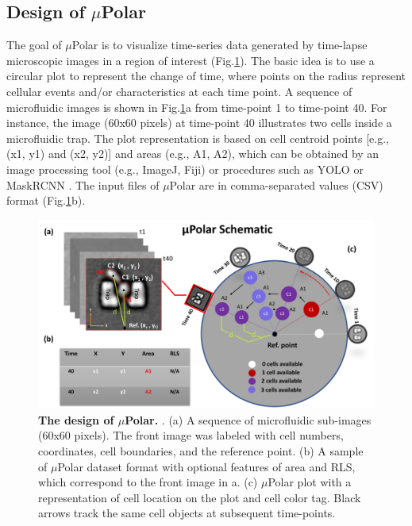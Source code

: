 \documentclass[conference]{IEEEtran}
\begin{document}
\subsection{Design of $\mu$Polar} 
The goal of $\mu$Polar  is to visualize time-series data generated by time-lapse microscopic images in a region of interest (Fig.\ref{fig:table}). The basic idea is to use a circular plot to represent the change of time, where points on the radius represent cellular events and/or characteristics at each time point. 
A sequence of microfluidic images is shown in Fig.\ref{fig:table}a from time-point 1 to time-point 40. For instance, the image (60x60 pixels) at time-point 40 illustrates two cells inside a microfluidic trap. The plot representation is based on cell centroid points [e.g., (x1, y1) and (x2, y2)] and areas (e.g., A1, A2), which can be obtained by an image processing tool (e.g., ImageJ, Fiji) or procedures such as YOLO or MaskRCNN \cite{r21,r22,r23,r24}. The input files of $\mu$Polar are in comma-separated values (CSV) format (Fig.\ref{fig:table}b).   

\begin{figure}
\centering
\includegraphics[width=\textwidth,height=10 cm]{Patterns/polar.pdf}
\caption{ \textbf{The design of $\mu$Polar. }. 
(a) A sequence of microfluidic sub-images (60x60 pixels). The front image was labeled with cell numbers, coordinates, cell boundaries, and the reference point. 
(b) A sample of $\mu$Polar dataset format with optional features of area and RLS, which correspond to the front image in a. (c) $\mu$Polar plot with a representation of cell location on the plot and cell color tag. Black arrows track the same cell objects at subsequent time-points.
}
\label{fig:table}
\end{figure}
\end{document}
